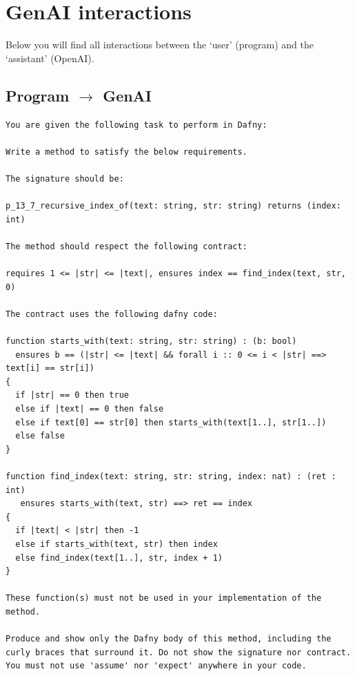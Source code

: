 \documentclass{article}
\begin{document}
\section*{GenAI interactions}
Below you will find all interactions between the `user' (program) and the `assistant' (OpenAI).
\subsection*{Program $\rightarrow$ GenAI}
\begin{lstlisting}
You are given the following task to perform in Dafny:

Write a method to satisfy the below requirements.

The signature should be:

p_13_7_recursive_index_of(text: string, str: string) returns (index: int)

The method should respect the following contract:

requires 1 <= |str| <= |text|, ensures index == find_index(text, str, 0)

The contract uses the following dafny code:

function starts_with(text: string, str: string) : (b: bool)
  ensures b == (|str| <= |text| && forall i :: 0 <= i < |str| ==> text[i] == str[i])
{
  if |str| == 0 then true
  else if |text| == 0 then false
  else if text[0] == str[0] then starts_with(text[1..], str[1..])
  else false
}

function find_index(text: string, str: string, index: nat) : (ret : int)
   ensures starts_with(text, str) ==> ret == index 
{
  if |text| < |str| then -1
  else if starts_with(text, str) then index
  else find_index(text[1..], str, index + 1)
}

These function(s) must not be used in your implementation of the method.

Produce and show only the Dafny body of this method, including the curly braces that surround it. Do not show the signature nor contract. You must not use 'assume' nor 'expect' anywhere in your code.
\end{lstlisting}
\end{document}
